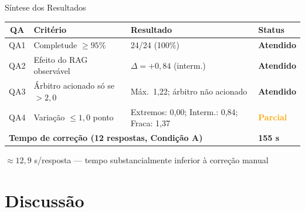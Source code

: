 \documentclass[10pt,aspectratio=169]{beamer}
\begin{document}
\begin{frame}{Síntese dos Resultados}
  \begin{center}
    \begin{tabular}{clll}
      \toprule
      \textbf{QA} & \textbf{Critério} & \textbf{Resultado} & \textbf{Status} \\
      \midrule
      QA1 & Completude $\geq 95\%$           & 24/24 (100\%)        & \textcolor{iffgreen}{\textbf{Atendido}} \\
      QA2 & Efeito do RAG observável         & $\Delta = +0{,}84$ (interm.) & \textcolor{iffgreen}{\textbf{Atendido}} \\
      QA3 & Árbitro acionado só se $>2{,}0$  & Máx.\ 1,22; árbitro não acionado & \textcolor{iffgreen}{\textbf{Atendido}} \\
      QA4 & Variação $\leq 1{,}0$ ponto      & Extremos: 0,00; Interm.: 0,84; Fraca: 1,37 & \textcolor{orange}{\textbf{Parcial}} \\
      \midrule
      \multicolumn{3}{l}{\textbf{Tempo de correção (12 respostas, Condição A)}} & \textbf{155 s} \\
      \bottomrule
    \end{tabular}
  \end{center}
  \vspace{0.3em}
  \begin{center}
    \small $\approx 12{,}9$ s/resposta --- tempo substancialmente inferior à correção manual
  \end{center}
\end{frame}

\section{Discussão}
\end{document}
